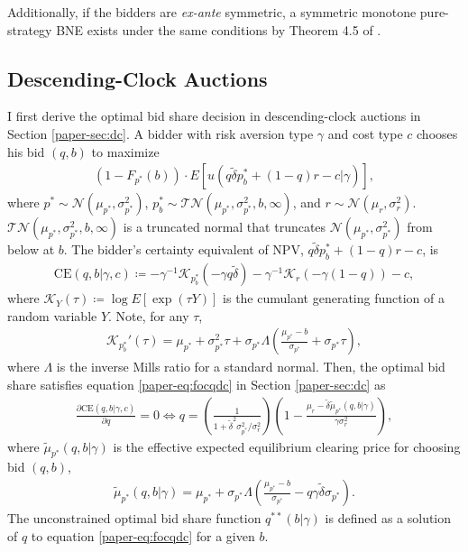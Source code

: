 \documentclass[12pt]{article}
\theoremstyle{definition} %
\begin{document}
Additionally, if the bidders are \textit{ex-ante} symmetric, a symmetric monotone pure-strategy BNE exists under the same conditions by Theorem 4.5 of \citet{Reny2011}.

\subsection{Descending-Clock Auctions}
\label{sec:eqdc}

I first derive the optimal bid share decision in descending-clock auctions in Section \ref{paper-sec:dc}. A bidder with risk aversion type $\gamma$ and cost type $c$ chooses his bid $(q,b) $ to maximize
\begin{align*}
(1-F_{p^\ast}(b)) \cdot E[u(q \tilde{\delta} p_b^\ast + (1 - q) r - c|\gamma)],
\end{align*}
where $p^\ast \sim \mathcal{N}(\mu_{p^\ast},\sigma_{p^\ast}^2)$, $p_b^\ast \sim \mathcal{TN}(\mu_{p^\ast},\sigma_{p^\ast}^2,b,\infty)$, and $r \sim \mathcal{N}(\mu_r,\sigma_r^2)$.
$\mathcal{TN}(\mu_{p^\ast},\sigma_{p^\ast}^2,b,\infty) $ is a truncated normal that truncates $\mathcal{N}(\mu_{p^\ast},\sigma_{p^\ast}^2)$ from below at $b$. The bidder's certainty equivalent of NPV, $q \tilde{\delta} p_b^\ast + (1 - q) r - c$, is
\begin{align*}
\mathrm{CE}(q,b|\gamma,c) \coloneqq -\gamma^{-1} \mathcal{K}_{p_b^\ast}(-\gamma q \tilde{\delta}) -\gamma^{-1} \mathcal{K}_r(-\gamma(1-q)) - c,
\end{align*}
where $\mathcal{K}_Y(\tau) \coloneqq \log E[\exp(\tau Y)] $ is the cumulant generating function of a random variable $Y $. Note, for any $\tau $,
\begin{align*}
\mathcal{K}_{p_b^\ast}'(\tau) = \mu_{p^\ast} + \sigma_{p^\ast}^2 \tau + \sigma_{p^\ast} \Lambda \left(\frac{\mu_{p^\ast}-b}{\sigma_{p^\ast}} + \sigma_{p^\ast} \tau \right),
\end{align*}
where $\Lambda $ is the inverse Mills ratio for a standard normal. Then, the optimal bid share satisfies equation \eqref{paper-eq:focqdc} in Section \ref{paper-sec:dc} as
\begin{align*}
\frac{\partial \mathrm{CE}(q,b|\gamma,c)}{\partial q} = 0 \iff q = \left( \frac{1}{1 + \tilde{\delta}^2 \sigma_{p^\ast}^2/\sigma_r^2} \right) \left( 1 - \frac{\mu_r - \tilde{\delta} \tilde{\mu}_{p^\ast}(q,b|\gamma)}{\gamma \sigma_r^2} \right),
\end{align*}
where $\tilde{\mu}_{p^\ast}(q,b|\gamma) $ is the effective expected equilibrium clearing price for choosing bid $(q,b)$,
\begin{align*}
\tilde{\mu}_{p^\ast}(q,b|\gamma) = \mu_{p^\ast} + \sigma_{p^\ast} \Lambda \left(\frac{\mu_{p^\ast} - b}{\sigma_{p^\ast}} - q \gamma \tilde{\delta} \sigma_{p^\ast} \right).
\end{align*}
The unconstrained optimal bid share function $q^{\ast\ast}(b|\gamma) $ is defined as a solution of $q$ to equation \eqref{paper-eq:focqdc} for a given $b $.
\end{document}
